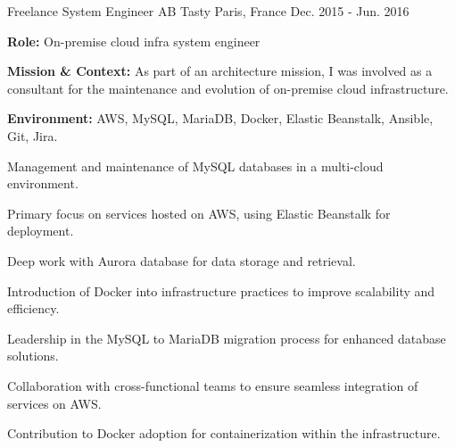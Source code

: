 \begin{cventries}
\cventry
{Freelance System Engineer} %
{AB Tasty} %
{Paris, France} %
{Dec. 2015 - Jun. 2016} %
{
  \begin{cvitems} %
    \item {\textbf{Role:} On-premise cloud infra system engineer}
    \item {\textbf{Mission \& Context:} As part of an architecture mission, I was involved as a consultant for the maintenance and evolution of on-premise cloud infrastructure.}
    \item {\textbf{Environment:} AWS, MySQL, MariaDB, Docker, Elastic Beanstalk, Ansible, Git, Jira.}
    \item {Management and maintenance of MySQL databases in a multi-cloud environment.}
    \item {Primary focus on services hosted on AWS, using Elastic Beanstalk for deployment.}
    \item {Deep work with Aurora database for data storage and retrieval.}
    \item {Introduction of Docker into infrastructure practices to improve scalability and efficiency.}
    \item {Leadership in the MySQL to MariaDB migration process for enhanced database solutions.}
    \item {Collaboration with cross-functional teams to ensure seamless integration of services on AWS.}
    \item {Contribution to Docker adoption for containerization within the infrastructure.}
  \end{cvitems}
}


\end{cventries}
